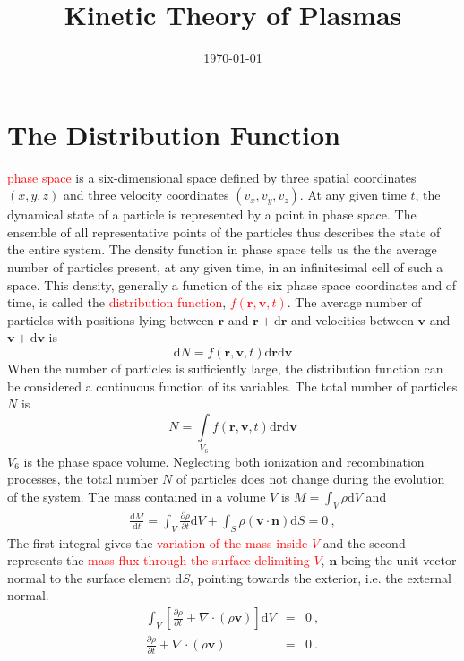 \documentclass[12pt,a4paper]{article}
\title{Kinetic Theory of Plasmas}
\author{}
\date{\today}
\renewcommand{\vec}[1]{\boldsymbol{#1}}
\newcommand{\dif}{\mathrm{d}}
\begin{document}
\maketitle

\section{The Distribution Function}
\textcolor{red}{phase space} is a six-dimensional space defined by three spatial coordinates $(x, y, z)$ and three velocity coordinates $(v_x, v_y, v_z)$. At any given time $t$, the dynamical state of a particle is represented by a point in phase space. The ensemble of all representative points of the particles thus describes the state of the entire system. The density function in phase space tells us the the average number of particles present, at any given time, in an infinitesimal cell of such a space. This density, generally a function of the six phase space coordinates and of time, is called the \textcolor{red}{distribution function}, \textcolor{red}{$f(\vec{r}, \vec{v}, t)$}. The average number of particles with positions lying between $\vec{r}$ and $\vec{r} + \dif \vec{r}$ and velocities between $\vec{v}$ and $\vec{v} + \dif \vec{v}$ is
\begin{equation}
\dif N = f(\vec{r}, \vec{v}, t) \dif \vec{r} \dif \vec{v}
\end{equation}
When the number of particles is sufficiently large, the distribution function can be considered a continuous function of its variables. The total number of particles $N$ is
\begin{equation*}
N = \int\limits_{V_6} f(\vec{r}, \vec{v}, t) \dif \vec{r} \dif \vec{v}
\end{equation*}
$V_6$ is the phase space volume. Neglecting both ionization and recombination processes, the total number $N$ of particles does not change during the evolution of the system. The mass contained in a volume $V$ is $M = \int_V \rho \dif V$ and
\begin{eqnarray*}
\frac{\dif M}{\dif t} = \int_V \frac{\partial \rho}{\partial t} \dif V +\int_S \rho(\vec{v} \cdot \vec{n}) \dif S = 0 ~,
\end{eqnarray*}
The first integral gives the \textcolor{red}{variation of the mass inside $V$} and the second represents the \textcolor{red}{mass flux through the surface delimiting $V$}, $\vec{n}$ being the unit vector normal to the surface element $\dif S$, pointing towards the exterior, i.e. the external normal.
\begin{eqnarray*}
\int_V \left[\frac{\partial \rho}{\partial t} +\nabla \cdot (\rho \vec{v}) \right] \dif V &=& 0 ~, \\
\frac{\partial \rho}{\partial t} +\nabla \cdot (\rho \vec{v}) &=& 0 ~.
\end{eqnarray*}
\end{document}
